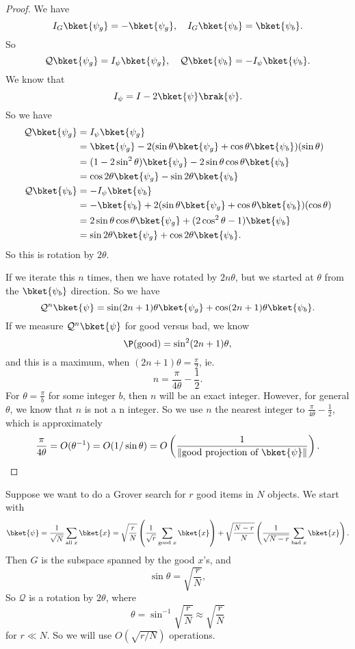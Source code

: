 \documentclass[a4paper]{article}
\begin{document}
\begin{proof}
  We have
  \[
    I_G \bket{\psi_g} = - \bket{\psi_g},\quad I_G \bket{\psi_b} = \bket{\psi_b}.
  \]
  So
  \[
    \mathcal{Q} \bket{\psi_g} = I_\psi \bket{\psi_g}, \quad \mathcal{Q} \bket{\psi_b} = - I_\psi \bket{\psi_b}.
  \]
  We know that
  \[
    I_\psi = I - 2\bket{\psi}\brak{\psi}.
  \]
  So we have
  \begin{align*}
    \mathcal{Q} \bket{\psi_g} &= I_\psi \bket{\psi_g}\\
    &= \bket{\psi_g} - 2(\sin \theta \bket{\psi_g} + \cos \theta \bket{\psi_b})(\sin \theta)\\
    &= (1 - 2 \sin^2 \theta) \bket{\psi_g} - 2 \sin \theta \cos \theta \bket{\psi_b}\\
    &= \cos 2\theta \bket{\psi_g} - \sin 2\theta \bket{\psi_b}\\
    \mathcal{Q} \bket{\psi_b} &= - I_\psi \bket{\psi_b}\\
    &= -\bket{\psi_b} + 2(\sin \theta \bket{\psi_g} + \cos \theta \bket{\psi_b})(\cos \theta)\\
    &= 2 \sin \theta \cos \theta \bket{\psi_g} + (2\cos^2 \theta - 1) \bket{\psi_b}\\
    &= \sin 2 \theta \bket{\psi_g} + \cos 2 \theta \bket{\psi_b}.
  \end{align*}
  So this is rotation by $2 \theta$.

  If we iterate this $n$ times, then we have rotated by $2n \theta$, but we started at $\theta$ from the $\bket{\psi_b}$ direction. So we have
  \[
    \mathcal{Q}^n \bket{\psi} = \sin (2n + 1) \theta \bket{\psi_g} + \cos (2n + 1) \theta \bket{\psi_b}.
  \]
  If we measure $\mathcal{Q}^n\bket{\psi}$ for good versus bad, we know
  \[
    \P(\text{good}) = \sin^2 (2n + 1)\theta,
  \]
  and this is a maximum, when $(2n + 1) \theta = \frac{\pi}{2}$, ie.
  \[
    n = \frac{\pi}{4 \theta} - \frac{1}{2}.
  \]
  For $\theta = \frac{\pi}{b}$ for some integer $b$, then $n$ will be an exact integer. However, for general $\theta$, we know that $n$ is not a n integer. So we use $n$ the nearest integer to $\frac{\pi}{4 \theta} - \frac{1}{2}$, which is approximately
  \[
    \frac{\pi}{4 \theta} = O(\theta^{-1}) = O(1/\sin \theta) = O\left(\frac{1}{\|\text{good projection of }\bket{\psi}\|}\right).
  \]
\end{proof}

\begin{eg}
  Suppose we want to do a Grover search for $r$ good items in $N$ objects. We start with
  \[
    \bket{\psi} = \frac{1}{\sqrt{N}} \sum_{\text{all }x} \bket{x} = \sqrt{\frac{r}{N}}\left(\frac{1}{\sqrt{r}} \sum_{\text{good }x} \bket{x}\right) + \sqrt{\frac{N - r}{N}}\left(\frac{1}{\sqrt{N - r}} \sum_{\text{bad }x} \bket{x}\right).
  \]
  Then $G$ is the subspace spanned by the good $x$'s, and
  \[
    \sin \theta =\sqrt{\frac{r}{N}},
  \]
  So $\mathcal{Q}$ is a rotation by $2\theta$, where
  \[
    \theta = \sin^{-1}\sqrt{\frac{r}{N}} \approx \sqrt{\frac{r}{N}}
  \]
  for $r \ll N$. So we will use $O(\sqrt{r/N})$ operations.
\end{eg}
\end{document}
